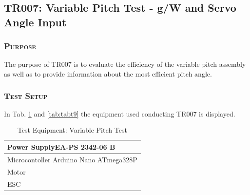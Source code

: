  
\newpage       
\subsection{TR007: Variable Pitch Test - g/W and Servo Angle Input}
         {}


\subsubsection*{\textsc{\medium Purpose}}
The purpose of TR007 is to evaluate the efficiency of the variable pitch assembly as well as to provide information about the most efficient pitch angle. 

\subsubsection*{\textsc{\medium Test Setup}}
In Tab. \ref{tab:tabt8} and \ref{tab:tabt9} the equipment used conducting TR007 is displayed. 
\begin {table}[H]
    \begin{center}
    \caption {Test Equipment: Variable Pitch Test } 
    \label{tab:tabt8} 
    \begin{tabular}{|l|}\hline 
        Power SupplyEA-PS 2342-06 B           \\ \hline
        Microcontoller Arduino Nano ATmega328P \\ \hline
        Motor \\ \hline
        ESC\\ \hline    
        \end{tabular}
    \end{center}
\end{table}

